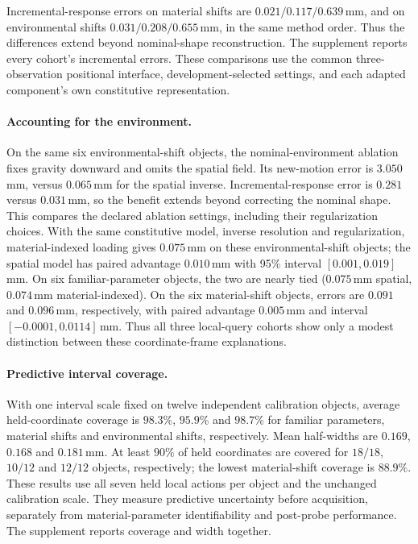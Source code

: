 Incremental-response errors on material shifts are $0.021/0.117/0.639$\,mm, and on environmental shifts $0.031/0.208/0.655$\,mm, in the same method order. Thus the differences extend beyond nominal-shape reconstruction. The supplement reports every cohort's incremental errors. These comparisons use the common three-observation positional interface, development-selected settings, and each adapted component's own constitutive representation.

\paragraph{Accounting for the environment.}
On the same six environmental-shift objects, the nominal-environment ablation fixes gravity downward and omits the spatial field. Its new-motion error is $3.050$\,mm, versus $0.065$\,mm for the spatial inverse. Incremental-response error is $0.281$ versus $0.031$\,mm, so the benefit extends beyond correcting the nominal shape. This compares the declared ablation settings, including their regularization choices. With the same constitutive model, inverse resolution and regularization, material-indexed loading gives $0.075$\,mm on these environmental-shift objects; the spatial model has paired advantage $0.010$\,mm with 95\% interval $[0.001,0.019]$\,mm. On six familiar-parameter objects, the two are nearly tied ($0.075$\,mm spatial, $0.074$\,mm material-indexed). On the six material-shift objects, errors are $0.091$ and $0.096$\,mm, respectively, with paired advantage $0.005$\,mm and interval $[-0.0001,0.0114]$\,mm. Thus all three local-query cohorts show only a modest distinction between these coordinate-frame explanations.

\paragraph{Predictive interval coverage.}
With one interval scale fixed on twelve independent calibration objects, average held-coordinate coverage is $98.3\%$, $95.9\%$ and $98.7\%$ for familiar parameters, material shifts and environmental shifts, respectively. Mean half-widths are $0.169$, $0.168$ and $0.181$\,mm. At least $90\%$ of held coordinates are covered for $18/18$, $10/12$ and $12/12$ objects, respectively; the lowest material-shift coverage is $88.9\%$. These results use all seven held local actions per object and the unchanged calibration scale. They measure predictive uncertainty before acquisition, separately from material-parameter identifiability and post-probe performance. The supplement reports coverage and width together.

